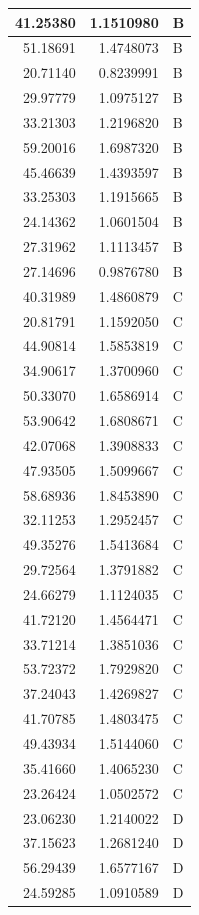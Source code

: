 \documentclass[
  letterpaper,
  DIV=11,
  numbers=noendperiod]{scrartcl}
\begin{document}
\begin{table}
\begin{tabular}[t]{r|r|l}
\hline
41.25380 & 1.1510980 & B\\
\hline
51.18691 & 1.4748073 & B\\
\hline
20.71140 & 0.8239991 & B\\
\hline
29.97779 & 1.0975127 & B\\
\hline
33.21303 & 1.2196820 & B\\
\hline
59.20016 & 1.6987320 & B\\
\hline
45.46639 & 1.4393597 & B\\
\hline
33.25303 & 1.1915665 & B\\
\hline
24.14362 & 1.0601504 & B\\
\hline
27.31962 & 1.1113457 & B\\
\hline
27.14696 & 0.9876780 & B\\
\hline
40.31989 & 1.4860879 & C\\
\hline
20.81791 & 1.1592050 & C\\
\hline
44.90814 & 1.5853819 & C\\
\hline
34.90617 & 1.3700960 & C\\
\hline
50.33070 & 1.6586914 & C\\
\hline
53.90642 & 1.6808671 & C\\
\hline
42.07068 & 1.3908833 & C\\
\hline
47.93505 & 1.5099667 & C\\
\hline
58.68936 & 1.8453890 & C\\
\hline
32.11253 & 1.2952457 & C\\
\hline
49.35276 & 1.5413684 & C\\
\hline
29.72564 & 1.3791882 & C\\
\hline
24.66279 & 1.1124035 & C\\
\hline
41.72120 & 1.4564471 & C\\
\hline
33.71214 & 1.3851036 & C\\
\hline
53.72372 & 1.7929820 & C\\
\hline
37.24043 & 1.4269827 & C\\
\hline
41.70785 & 1.4803475 & C\\
\hline
49.43934 & 1.5144060 & C\\
\hline
35.41660 & 1.4065230 & C\\
\hline
23.26424 & 1.0502572 & C\\
\hline
23.06230 & 1.2140022 & D\\
\hline
37.15623 & 1.2681240 & D\\
\hline
56.29439 & 1.6577167 & D\\
\hline
24.59285 & 1.0910589 & D\\

\end{tabular}
\end{table}
\end{document}
